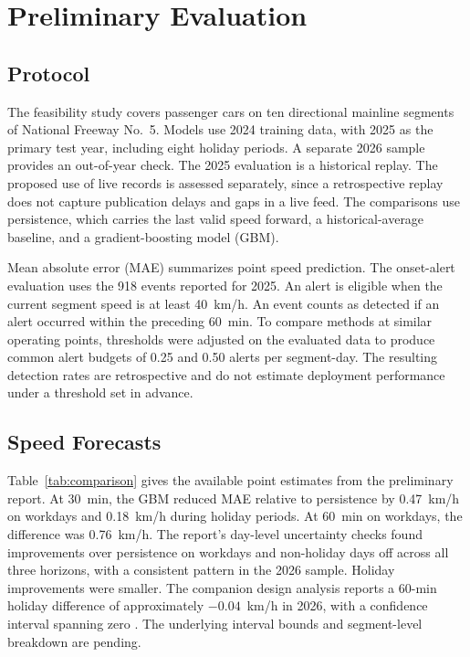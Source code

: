 \section{Preliminary Evaluation}
\subsection{Protocol}
The feasibility study covers passenger cars on ten directional mainline segments of National Freeway No.~5. Models use 2024 training data, with 2025 as the primary test year, including eight holiday periods. A separate 2026 sample provides an out-of-year check. The 2025 evaluation is a historical replay. The proposed use of live records is assessed separately, since a retrospective replay does not capture publication delays and gaps in a live feed. The comparisons use persistence, which carries the last valid speed forward, a historical-average baseline, and a gradient-boosting model (GBM).

Mean absolute error (MAE) summarizes point speed prediction. The onset-alert evaluation uses the 918 events reported for 2025. An alert is eligible when the current segment speed is at least 40~km/h. An event counts as detected if an alert occurred within the preceding 60~min. To compare methods at similar operating points, thresholds were adjusted on the evaluated data to produce common alert budgets of 0.25 and 0.50 alerts per segment-day. The resulting detection rates are retrospective and do not estimate deployment performance under a threshold set in advance.



\subsection{Speed Forecasts}
Table~\ref{tab:comparison} gives the available point estimates from the preliminary report. At 30~min, the GBM reduced MAE relative to persistence by 0.47~km/h on workdays and 0.18~km/h during holiday periods. At 60~min on workdays, the difference was 0.76~km/h. The report's day-level uncertainty checks found improvements over persistence on workdays and non-holiday days off across all three horizons, with a consistent pattern in the 2026 sample. Holiday improvements were smaller. The companion design analysis reports a 60-min holiday difference of approximately \(-0.04\)~km/h in 2026, with a confidence interval spanning zero \cite{dic3designnotes}. The underlying interval bounds and segment-level breakdown are pending.

